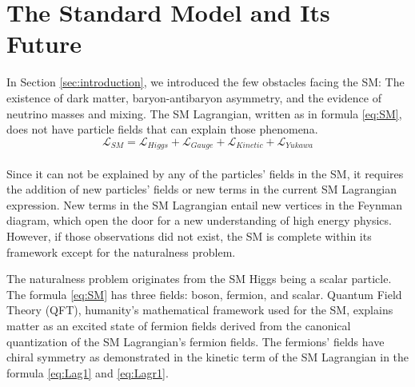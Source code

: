 \chapter{The Standard Model and Its Future}\label{sec:theory}
In Section \ref{sec:introduction}, we introduced the few obstacles facing the SM: The existence of dark matter, baryon-antibaryon asymmetry, and the evidence of neutrino masses and mixing.
The SM Lagrangian, written as in formula \ref{eq:SM}, does not have particle fields that can explain those phenomena.
\begin{equation}
\label{eq:SM}
\mathcal{L}_{SM} = \mathcal{L}_{Higgs}+\mathcal{L}_{Gauge}+\mathcal{L}_{Kinetic}+\mathcal{L}_{Yukawa}
\end{equation}
\begin{align*}
\end{align*}

Since it can not be explained by any of the particles' fields in the SM, it requires the addition of new particles' fields or new terms in the current SM Lagrangian expression.
New terms in the SM Lagrangian entail new vertices in the Feynman diagram, which open the door for a new understanding of high energy physics.
However, if those observations did not exist, the SM is complete within its framework except for the naturalness problem.

The naturalness problem originates from the SM Higgs being a scalar particle.
The formula \ref{eq:SM} has three fields: boson, fermion, and scalar.
Quantum Field Theory (QFT), humanity's mathematical framework used for the SM, explains matter as an excited state of fermion fields derived from the canonical quantization of the SM Lagrangian's fermion fields.
The fermions' fields have chiral symmetry as demonstrated in the kinetic term of the SM Lagrangian in the formula \ref{eq:Lag1} and \ref{eq:Lagr1}.

